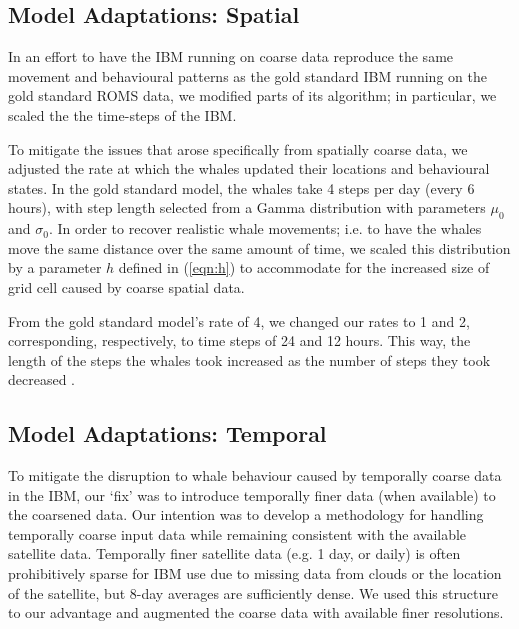 \documentclass[11pt]{article}
\begin{document}
\subsection{Model Adaptations: Spatial}
In an effort to have the IBM running on coarse data reproduce the same movement and behavioural patterns as the gold standard IBM running on the gold standard ROMS data, we modified parts of its algorithm; in particular, we scaled the the time-steps of the IBM. \par

To mitigate the issues that arose specifically from spatially coarse data, we adjusted the rate at which the whales updated their locations and behavioural states. In the gold standard model, the whales take 4 steps per day (every 6 hours), with step length selected from a Gamma distribution with parameters $\mu_0$ and $\sigma_0$. In order to recover realistic whale movements; i.e. to have the whales move the same distance over the same amount of time, we scaled this distribution by a parameter $h$ defined in (\ref{eqn:h})
to accommodate for the increased size of grid cell caused by coarse spatial data. \par

From the gold standard model's rate of 4, we changed our rates to 1 and 2, corresponding, respectively, to time steps of 24 and 12 hours. This way, the length of the steps the whales took increased as the number of steps they took decreased \cite{Bailey}. \par

\subsection{Model Adaptations: Temporal}
To mitigate the disruption to whale behaviour caused by temporally coarse data in the IBM, our ‘fix’ was to introduce temporally finer data (when available) to the coarsened data. Our intention was to develop a methodology for handling temporally coarse input data while remaining consistent with the available satellite data. Temporally finer satellite data (e.g. 1 day, or daily) is often prohibitively sparse for IBM use due to missing data from clouds or the location of the satellite, but 8-day averages are sufficiently dense. We used this structure to our advantage and augmented the coarse data with available finer resolutions. \par
\end{document}
